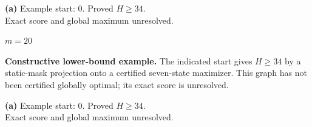 \documentclass[11pt,a4paper]{article}
\begin{document}
\begin{minipage}[t]{.94\textwidth}\centering
\resizebox{10.3cm}{!}{}\par
\small\textbf{(a)} Example start: $0$. Proved $H\ge34$.\\Exact score and global maximum unresolved.\par\end{minipage}
\clearpage
{\LARGE\bfseries $m=20$}\par\vspace{3mm}
\textbf{Constructive lower-bound example.} The indicated start gives $H\ge34$ by a static-mask projection onto a certified seven-state maximizer. This graph has not been certified globally optimal; its exact score is unresolved.\par\vspace{3mm}
\begin{minipage}[t]{.94\textwidth}\centering
\resizebox{10.3cm}{!}{}\par
\small\textbf{(a)} Example start: $0$. Proved $H\ge34$.\\Exact score and global maximum unresolved.\par\end{minipage}
\end{document}
